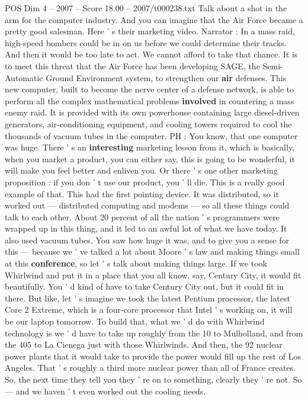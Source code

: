 \begin{textsample}{POS Dim 4 – 2007 – Score 18.00 – 2007/t000238.txt}
Talk about a shot in the arm for the computer industry.
And you can imagine that the Air Force became a pretty good salesman.
Here ' s their marketing video.
Narrator : In a mass raid, high-speed bombers could be in on us before we could determine their tracks.
And then it would be too late to act.
We cannot afford to take that chance.
It is to meet this threat that the Air Force has been developing SAGE, the Semi-Automatic Ground Environment system, to strengthen our \textbf{air} defenses.
This new computer, built to become the nerve center of a defense network, is able to perform all the complex mathematical problems \textbf{involved} in countering a mass enemy raid.
It is provided with its own powerhouse containing large diesel-driven generators, air-conditioning equipment, and cooling towers required to cool the thousands of vacuum tubes in the computer.
PH : You know, that one computer was huge.
There ' s an \textbf{interesting} marketing lesson from it, which is basically, when you market a product, you can either say, this is going to be wonderful, it will make you feel better and enliven you.
Or there ' s one other marketing proposition : if you don ' t use our product, you ' ll die.
This is a really good example of that.
This had the first pointing device.
It was distributed, so it worked out — distributed computing and modems — so all these things could talk to each other.
About 20 percent of all the nation ' s programmers were wrapped up in this thing, and it led to an awful lot of what we have today.
It also used vacuum tubes.
You saw how huge it was, and to give you a sense for this — because we ' ve talked a lot about Moore ' s law and making things small at this \textbf{conference}, so let ' s talk about making things large.
If we took Whirlwind and put it in a place that you all know, say, Century City, it would fit beautifully.
You ' d kind of have to take Century City out, but it could fit in there.
But like, let ' s imagine we took the latest Pentium processor, the latest Core 2 Extreme, which is a four-core processor that Intel ' s working on, it will be our laptop tomorrow.
To build that, what we ' d do with Whirlwind technology is we ' d have to take up roughly from the 10 to Mulholland, and from the 405 to La Cienega just with those Whirlwinds.
And then, the 92 nuclear power plants that it would take to provide the power would fill up the rest of Los Angeles.
That ' s roughly a third more nuclear power than all of France creates.
So, the next time they tell you they ' re on to something, clearly they ' re not.
So — and we haven ' t even worked out the cooling needs.

\end{textsample}
